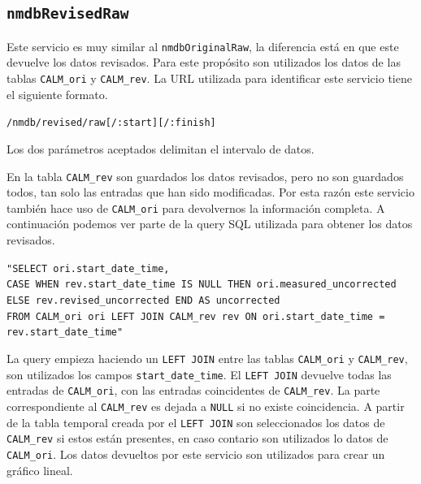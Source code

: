 	\subsection{\texttt{nmdbRevisedRaw}}
		Este servicio es muy similar al \texttt{nmdbOriginalRaw}, la diferencia está en que este devuelve los datos revisados. Para este
		propósito son utilizados los datos de las tablas \texttt{CALM\_ori} y \texttt{CALM\_rev}. La URL utilizada para identificar este
		servicio tiene el siguiente formato.
	  		\begin{center} \texttt{/nmdb/revised/raw[/:start][/:finish]}  \end{center} 
		Los dos parámetros aceptados delimitan el intervalo de datos.
		\par
		En la tabla \texttt{CALM\_rev} son guardados los datos revisados, pero no son guardados todos, tan solo las entradas que han sido
		modificadas. Por esta razón este servicio también hace uso de \texttt{CALM\_ori} para devolvernos la información completa. A
		continuación podemos ver parte de la query SQL utilizada para obtener los datos revisados.
			\begin{center} \texttt{"SELECT ori.start\_date\_time,
			  		\\	CASE WHEN rev.start\_date\_time IS NULL THEN ori.measured\_uncorrected ELSE rev.revised\_uncorrected END AS uncorrected 
					\\	FROM CALM\_ori ori LEFT JOIN CALM\_rev rev ON ori.start\_date\_time = rev.start\_date\_time"}
			\end{center} 
		La query empieza haciendo un \texttt{LEFT JOIN} entre las tablas \texttt{CALM\_ori} y \texttt{CALM\_rev}, son utilizados los campos
		\texttt{start\_date\_time}. El \texttt{LEFT JOIN} devuelve todas las entradas de \texttt{CALM\_ori}, con las entradas coincidentes de
		\texttt{CALM\_rev}. La parte correspondiente al \texttt{CALM\_rev} es dejada a \texttt{NULL} si no existe coincidencia. A partir de la
		tabla temporal creada por el \texttt{LEFT JOIN} son seleccionados los datos de \texttt{CALM\_rev} si estos están presentes, en caso
		contario son utilizados lo datos de \texttt{CALM\_ori}. Los datos devueltos por este servicio son utilizados para crear un gráfico
		lineal.
